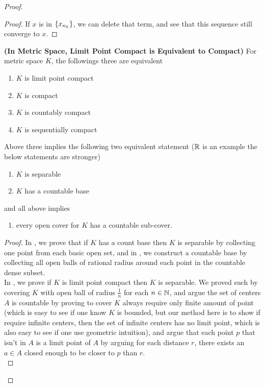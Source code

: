 \documentclass{report}
\begin{document}
\begin{proof}
\begin{proof}
If $x$ is in $\{ x_{n_k} \}$, we can delete that term, and see that this sequence still converge to $x$.
\end{proof}
\begin{theorem}
\label{3.5.7}
\textbf{(In Metric Space, Limit Point Compact is Equivalent to Compact)} For metric space $K$, the followings three are equivalent
\begin{enumerate}[label=(\alph*)]
  \item $K$ is limit point compact 
  \item $K$ is compact 
  \item $K$ is countably compact 
  \item $K$ is sequentially compact
\end{enumerate}
Above three implies the following two equivalent statement ($\mathbb{R}$ is an example the below statements are stronger)
\begin{enumerate}[label=(\arabic*)]
  \item $K$ is separable
  \item $K$ has a countable base
\end{enumerate}
and all above implies
\begin{enumerate}[label=(\roman*)]
  \item every open cover for $K$ has a countable sub-cover.
\end{enumerate}
\end{theorem}
\begin{proof}
In , we prove that if $K$ has a count base then $K$ is separable by collecting one point from each basic open set, and in , we construct a countable base by collecting all open balls of rational radius around each point in the countable dense subset.\\

In , we prove if $K$ is limit point compact then  $K$ is separable. We proved such by covering $K$ with open ball of radius $\frac{1}{n}$ for each $n\in\mathbb{N}$, and argue the set of centers $A$ is countable by proving to cover $K$ always require only finite amount of point (which is easy to see if one know $K$ is bounded, but our method here is to show if require infinite centers, then the set of infinite centers has no limit point, which is also easy to see if one use geometric intuition), and argue that each point $p$ that isn't in $A$ is a limit point of $A$ by arguing for each distance $r$, there exists an  $a\in A$ closed enough to be closer to $p$ than $r$.\\


\end{proof}
\end{proof}
\end{document}
